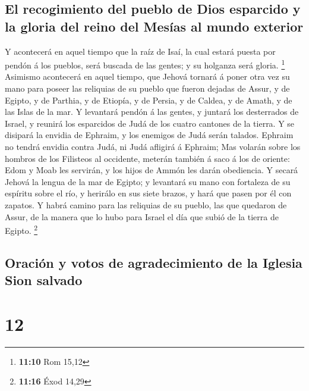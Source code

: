 \hypertarget{el-recogimiento-del-pueblo-de-dios-esparcido-y-la-gloria-del-reino-del-mesuxedas-al-mundo-exterior}{%
\subsection{El recogimiento del pueblo de Dios esparcido y la gloria del
reino del Mesías al mundo
exterior}\label{el-recogimiento-del-pueblo-de-dios-esparcido-y-la-gloria-del-reino-del-mesuxedas-al-mundo-exterior}}

 Y acontecerá en aquel tiempo que la raíz de Isaí, la
cual estará puesta por pendón á los pueblos, será buscada de las gentes;
y su holganza será gloria. \footnote{\textbf{11:10} Rom 15,12}
 Asimismo acontecerá en aquel tiempo, que Jehová tornará
á poner otra vez su mano para poseer las reliquias de su pueblo que
fueron dejadas de Assur, y de Egipto, y de Parthia, y de Etiopía, y de
Persia, y de Caldea, y de Amath, y de las Islas de la mar.
 Y levantará pendón á las gentes, y juntará los
desterrados de Israel, y reunirá los esparcidos de Judá de los cuatro
cantones de la tierra.  Y se disipará la envidia de
Ephraim, y los enemigos de Judá serán talados. Ephraim no tendrá envidia
contra Judá, ni Judá afligirá á Ephraim;  Mas volarán
sobre los hombros de los Filisteos al occidente, meterán también á saco
á los de oriente: Edom y Moab les servirán, y los hijos de Ammón les
darán obediencia.  Y secará Jehová la lengua de la mar de
Egipto; y levantará su mano con fortaleza de su espíritu sobre el río, y
herirálo en sus siete brazos, y hará que pasen por él con zapatos.
 Y habrá camino para las reliquias de su pueblo, las que
quedaron de Assur, de la manera que lo hubo para Israel el día que subió
de la tierra de Egipto. \footnote{\textbf{11:16} Éxod 14,29}

\hypertarget{oraciuxf3n-y-votos-de-agradecimiento-de-la-iglesia-sion-salvado}{%
\subsection{Oración y votos de agradecimiento de la Iglesia Sion
salvado}\label{oraciuxf3n-y-votos-de-agradecimiento-de-la-iglesia-sion-salvado}}

\hypertarget{section-11}{%
\section{12}\label{section-11}}

